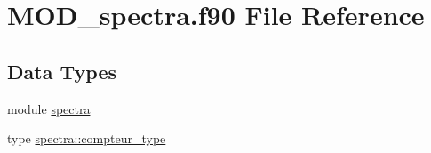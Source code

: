 \hypertarget{MOD__spectra_8f90}{\section{M\-O\-D\-\_\-spectra.\-f90 File Reference}
\label{MOD__spectra_8f90}
}
\subsection*{Data Types}
\begin{DoxyCompactItemize}
\item 
module \hyperlink{classspectra}{spectra}
\item 
type \hyperlink{structspectra_1_1compteur__type}{spectra\-::compteur\-\_\-type}
\end{DoxyCompactItemize}
